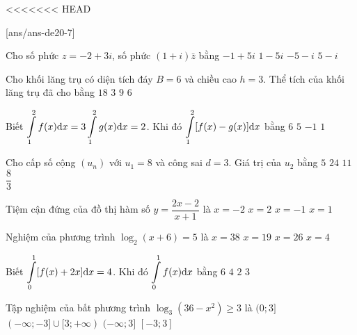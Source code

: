<<<<<<< HEAD

\begin{name}
	{\tenchude}
	{\tendethi}
	{\tentruong}
	{\thoigian}
\end{name}
[ans/ans-de20-7]

\begin{ex}%
Cho số phức $z=-2+3 i$, số phức $(1+i) \bar{z}$ bằng
\choice
{$-1+5 i$}
{\True $1-5 i$}
{$-5-i$}
{$5-i$}

\end{ex}
\begin{ex}%
Cho khối lăng trụ có diện tích đáy $B=6$ và chiều cao $h=3$. Thể tích của khối lăng trụ đã cho bằng
\choice
{\True $18$}
{$3$}
{$9$}
{$6$}

\end{ex}
\begin{ex}%
Biết $\displaystyle\displaystyle\int\limits_1^2 f(x) \mathrm{d} x=3\displaystyle\displaystyle\int\limits_1^2 g(x) \mathrm{d} x=2$. Khi đó $\displaystyle\displaystyle\int\limits_1^2[f(x)-g(x)] \mathrm{d} x$ bằng
\choice
{$6$}
{$5$}
{$-1$}
{\True $1$}

\end{ex}
\begin{ex}%
Cho cấp số cộng $\left(u_n\right)$ với $u_1=8$ và công sai $d=3$. Giá trị của $u_2$ bằng
\choice
{$5$}
{$24$}
{\True $11$}
{$\dfrac{8}{3}$}

\end{ex}
\begin{ex}%
Tiệm cận đứng của đồ thị hàm số $y=\dfrac{2 x-2}{x+1}$ là
\choice
{$x=-2$}
{$x=2$}
{\True $x=-1$}
{$x=1$}

\end{ex}
\begin{ex}%
Nghiệm của phương trình $\log_2(x+6)=5$ là
\choice
{$x=38$}
{$x=19$}
{\True $x=26$}
{$x=4$}

\end{ex}
\begin{ex}%
Biết $\displaystyle\displaystyle\int\limits_0^1[f(x)+2 x] \mathrm{d} x=4$. Khi đó $\displaystyle\displaystyle\int\limits_0^1 f(x) \mathrm{d} x$ bằng
\choice
{$6$}
{$4$}
{$2$}
{\True $3$}

\end{ex}
\begin{ex}%
Tập nghiệm của bất phương trình $\log_3\left(36-x^2\right) \geq 3$ là
\choice
{$(0; 3]$}
{$(-\infty;-3] \cup[3;+\infty)$}
{$(-\infty; 3]$}
{\True $[-3; 3]$}

\end{ex}
